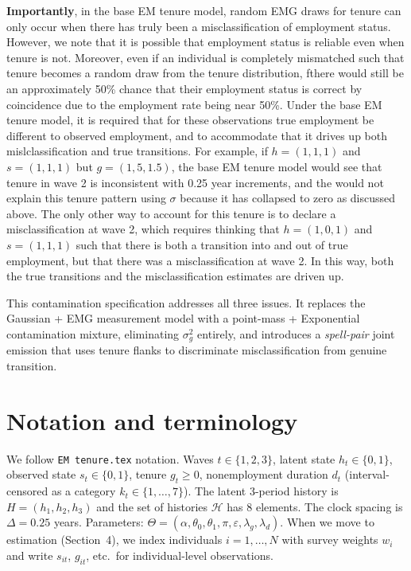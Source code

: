 \documentclass[12pt]{article}
\begin{document}
\textbf{Importantly}, in the base EM tenure model,
random EMG draws for tenure can only occur when there has truly been a misclassification
of employment status. However, we note that it is possible that employment status is reliable
even when tenure is not. Moreover, even if an individual is completely mismatched such
that tenure becomes a random draw from the tenure distribution, fthere would still be an
approximately 50\% chance that their employment status is correct by coincidence due 
to the employment rate being near 50\%. Under the base EM tenure model, it is required that
for these observations true employment be different to observed employment, and to accommodate
that it drives up both mislclassification and true transitions. For example, if \(h=(1,1,1)\) 
and \(s=(1,1,1)\) but \(g=(1, 5, 1.5)\), the base EM tenure model would see that 
tenure in wave 2 is inconsistent with 0.25 year increments, and the would not explain this
tenure pattern using \(\sigma\) because it has collapsed to zero as discussed above. The only
other way to account for this tenure is to declare a misclassification at wave 2, 
which requires thinking that \(h=(1,0,1)\) and \(s=(1,1,1)\) such that there is both a transition into
and out of true employment, but that there was a misclassification at wave 2. In this way, 
both the true transitions and the misclassification estimates are driven up.

This contamination specification addresses all three issues. 
It replaces the Gaussian + EMG measurement
model with a point-mass + Exponential contamination mixture, eliminating
\(\sigma_g^2\) entirely, and introduces a \emph{spell-pair} joint emission
that uses tenure flanks to discriminate misclassification from genuine
transition.

\section{Notation and terminology}

We follow \texttt{EM tenure.tex} notation.
Waves \(t \in \{1,2,3\}\), latent state \(h_{t} \in \{0,1\}\), observed
state \(s_{t} \in \{0,1\}\), tenure \(g_{t} \ge 0\), nonemployment
duration \(d_{t}\) (interval-censored as a category \(k_{t} \in \{1,\dots,7\}\)).
The latent 3-period history is \(H = (h_{1},h_{2},h_{3})\)
and the set of histories \(\mathcal{H}\) has 8 elements. The clock spacing
is \(\Delta = 0.25\) years. Parameters: \(\Theta = (\alpha,\theta_0,\theta_1,\pi,\varepsilon,\lambda_g,\lambda_d)\).
When we move to estimation (Section~4), we index individuals
\(i = 1,\dots,N\) with survey weights \(w_i\) and write
\(s_{it}\), \(g_{it}\), etc.\ for individual-level observations.
\end{document}
